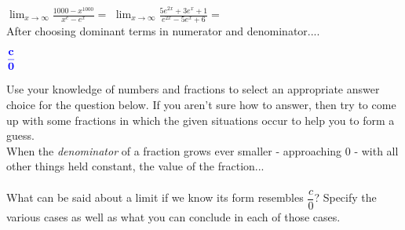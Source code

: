 \documentclass[10pt]{article}
\begin{document}
$\displaystyle\lim_{x\to\infty} \frac{1000-x^{1000}}{x^e-e^x}=$ 
\hfill 
$\displaystyle\lim_{x\to\infty} \frac{5e^{2x}+3e^x+1}{e^{2x}-5e^x+6}=$  
\hfill
\\
After choosing dominant terms in numerator and denominator....


\newpage
\lform ${\color{blue}\bf \dfrac{c}{0}}$



  Use your knowledge of numbers and fractions to select an appropriate answer choice for the question below. If you aren't sure how to answer, then try to come up with some fractions in which the given situations occur to help you to form a guess.\\

When the {\it denominator} of a fraction grows ever smaller - approaching $0$ - with all other things held constant, the value of the fraction...\\
\\
\minil What can be said about a limit if we know its form resembles $\dfrac{c}{0}$? Specify the various cases as well as what you can conclude in each of those cases.\\
\vfill
\vfill
\end{document}
